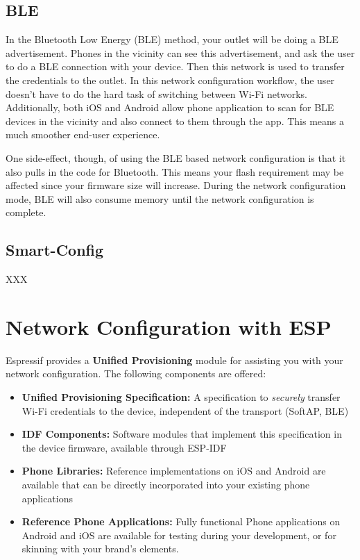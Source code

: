 \documentclass[11pt,fleqn]{book} %
\begin{document}
\subsection{BLE}

In the Bluetooth Low Energy (BLE) method, your outlet will be doing a BLE advertisement. Phones in the vicinity can see this advertisement, and ask the user to do a BLE connection with your device. Then this network is used to transfer the credentials to the outlet.
In this network configuration workflow, the user doesn't have to do the hard task of switching between Wi-Fi networks. Additionally, both iOS and Android allow phone application to scan for BLE devices in the vicinity and also connect to them through the app. This means a much smoother end-user experience.

One side-effect, though, of using the BLE based network configuration is that it also pulls in the code for Bluetooth. This means your flash requirement may be affected since your firmware size will increase. During the network configuration mode, BLE will also consume memory until the network configuration is complete.

\subsection{Smart-Config}
XXX

\section{Network Configuration with ESP}

Espressif provides a \textbf{Unified Provisioning} module for assisting you with your network configuration. The following components are offered:
\begin{itemize}
    \item \textbf{Unified Provisioning Specification:} A specification to \textit{securely} transfer Wi-Fi credentials to the device, independent of the transport (SoftAP, BLE)
    \item \textbf{IDF Components:} Software modules that implement this specification in the device firmware, available through ESP-IDF
    \item \textbf{Phone Libraries:} Reference implementations on iOS and Android are available that can be directly incorporated into your existing phone applications
    \item \textbf{Reference Phone Applications:} Fully functional Phone applications on Android and iOS are available for testing during your development, or for skinning with your brand's elements.
\end{itemize}
\end{document}
